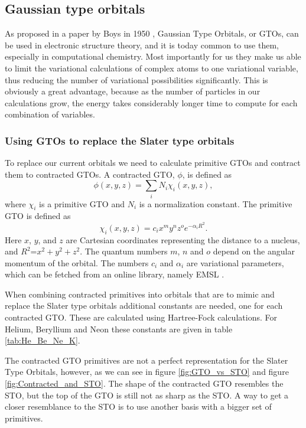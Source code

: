 
\subsection{Gaussian type orbitals}

	As proposed in a paper by Boys in 1950 \parencite{Boys_1950},
	Gaussian Type Orbitals, or GTOs, can be used in electronic structure
	theory, and it is today common to use them, especially in computational
	chemistry. Most importantly for us they make us able to limit the
	variational calculations of complex atoms to one variational variable,
	thus reducing the number of variational possibilities significantly.
	This is obviously a great advantage, because as the number of particles
	in our calculations grow, the energy takes considerably longer time
	to compute for each combination of variables. 


	\subsubsection{Using GTOs to replace the Slater type orbitals}

		To replace our current orbitals we need to calculate primitive GTOs
		and contract them to contracted GTOs. A contracted GTO, $\phi$,
		is defined as
		\[
		\phi\left(x,y,z\right)=\sum_{i}N_{i}\chi_{i}\left(x,y,z\right),
		\]
		where $\chi_{i}$ is a primitive GTO and $N_{i}$ is a normalization
		constant. The primitive GTO is defined as
		\[
		\chi_{i}\left(x,y,z\right)=c_{i}x^{m}y^{n}z^{o}e^{-\alpha_{i}R^{2}}.
		\]
		Here $x$, $y$, and $z$ are Cartesian coordinates representing the
		distance to a nucleus, and $R^{2}$=$x^{2}+y^{2}+z^{2}$. The quantum
		numbers $m$, $n$ and $o$ depend on the angular momentum of the
		orbital. The numbers $c_{i}$ and $\alpha_{i}$ are variational parameters,
		which can be fetched from an online library, namely EMSL \parencite{Binkley_1980}\parencite{EMSL}.

		When combining contracted primitives into orbitals that are to mimic
		and replace the Slater type orbitals additional constants are needed,
		one for each contracted GTO. These are calculated using Hartree-Fock
		calculations. For Helium, Beryllium and Neon these constants are given
		in table \ref{tab:He_Be_Ne_K}. 

		The contracted GTO primitives are not a perfect representation for the
		Slater Type Orbitals, however, as we can see in figure \ref{fig:GTO_vs_STO} 
		and figure \ref{fig:Contracted_and_STO}. The shape of the contracted GTO 
		resembles the STO, but the top of the GTO is still not as sharp as the STO.
		A way to get a closer resemblance to the STO is to use another basis with 
		a bigger set of primitives.

